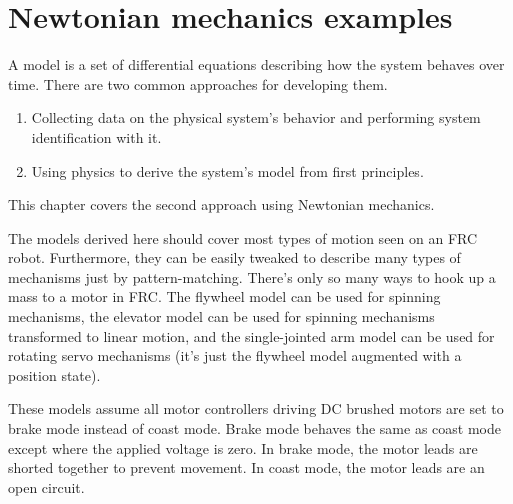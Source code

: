 
\chapter{Newtonian mechanics examples}

A \gls{model} is a set of differential equations describing how the \gls{system}
behaves over time. There are two common approaches for developing them.
\begin{enumerate}
  \item Collecting data on the physical system's behavior and performing
    \gls{system} identification with it.
  \item Using physics to derive the \gls{system}'s model from first principles.
\end{enumerate}

This chapter covers the second approach using Newtonian mechanics.

The \glspl{model} derived here should cover most types of motion seen on an FRC
robot. Furthermore, they can be easily tweaked to describe many types of
mechanisms just by pattern-matching. There's only so many ways to hook up a mass
to a motor in FRC. The flywheel \gls{model} can be used for spinning mechanisms,
the elevator \gls{model} can be used for spinning mechanisms transformed to
linear motion, and the single-jointed arm \gls{model} can be used for rotating
servo mechanisms (it's just the flywheel \gls{model} augmented with a position
\gls{state}).

These \glspl{model} assume all motor controllers driving DC brushed motors are
set to brake mode instead of coast mode. Brake mode behaves the same as coast
mode except where the applied voltage is zero. In brake mode, the motor leads
are shorted together to prevent movement. In coast mode, the motor leads are an
open circuit.

\renewcommand*{\chapterpath}{\partpath/newtonian-mechanics-examples}






